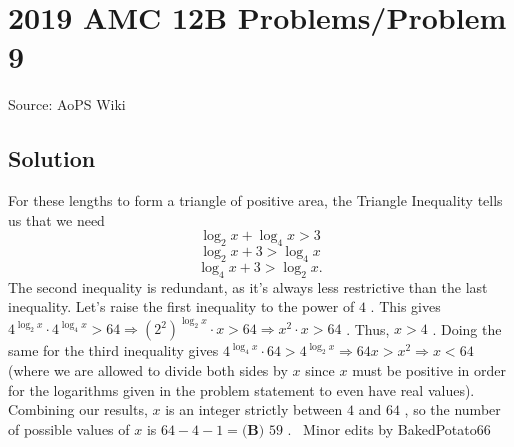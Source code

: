 \documentclass[12pt]{article}
\begin{document}
\section*{{2019 AMC 12B Problems/Problem 9}}
Source: AoPS Wiki

\subsection*{Solution}
For these lengths to form a triangle of positive area, the Triangle Inequality tells us that we need \[\log_2{x} + \log_4{x} > 3\] \[\log_2{x} + 3 > \log_4{x}\] \[\log_4{x} + 3 > \log_2{x}.\] The second inequality is redundant, as it's always less restrictive than the last inequality. Let's raise the first inequality to the power of $4$ . This gives $4^{\log_2{x}} \cdot 4^{\log_4{x}} > 64 \Rightarrow \left(2^2\right)^{\log_2{x}} \cdot x > 64 \Rightarrow x^2 \cdot x > 64$ . Thus, $x > 4$ . Doing the same for the third inequality gives $4^{\log_4{x}} \cdot 64 > 4^{\log_2{x}} \Rightarrow 64x > x^2 \Rightarrow x < 64$ (where we are allowed to divide both sides by $x$ since $x$ must be positive in order for the logarithms given in the problem statement to even have real values). Combining our results, $x$ is an integer strictly between $4$ and $64$ , so the number of possible values of $x$ is $64 - 4 - 1 = \boxed{\textbf{(B) } 59}$ . ~Minor edits by BakedPotato66
\end{document}
